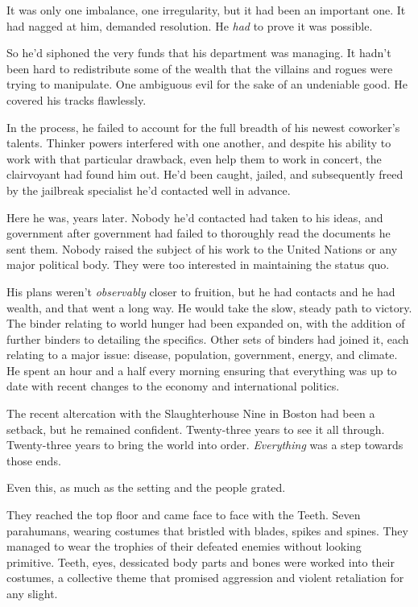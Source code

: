 It was only one imbalance, one irregularity, but it had been an important one.  It had nagged at him, demanded resolution.  He \emph{had} to prove it was possible.



So he'd siphoned the very funds that his department was managing.  It hadn't been hard to redistribute some of the wealth that the villains and rogues were trying to manipulate.  One ambiguous evil for the sake of an undeniable good.  He covered his tracks flawlessly.



In the process, he failed to account for the full breadth of his newest coworker's talents.  Thinker powers interfered with one another, and despite his ability to work with that particular drawback, even help them to work in concert, the clairvoyant had found him out.  He'd been caught, jailed, and subsequently freed by the jailbreak specialist he'd contacted well in advance.



Here he was, years later.  Nobody he'd contacted had taken to his ideas, and government after government had failed to thoroughly read the documents he sent them.  Nobody raised the subject of his work to the United Nations or any major political body.  They were too interested in maintaining the status quo.



His plans weren't \emph{observably }closer to fruition, but he had contacts and he had wealth, and that went a long way.  He would take the slow, steady path to victory.  The binder relating to world hunger had been expanded on, with the addition of further binders to detailing the specifics.  Other sets of binders had joined it, each relating to a major issue: disease, population, government, energy, and climate.  He spent an hour and a half every morning ensuring that everything was up to date with recent changes to the economy and international politics.



The recent altercation with the Slaughterhouse Nine in Boston had been a setback, but he remained confident.  Twenty-three years to see it all through.  Twenty-three years to bring the world into order.  \emph{Everything} was a step towards those ends.



Even this, as much as the setting and the people grated.



They reached the top floor and came face to face with the Teeth.  Seven parahumans, wearing costumes that bristled with blades, spikes and spines.  They managed to wear the trophies of their defeated enemies without looking primitive.  Teeth, eyes, dessicated body parts and bones were worked into their costumes, a collective theme that promised aggression and violent retaliation for any slight.



